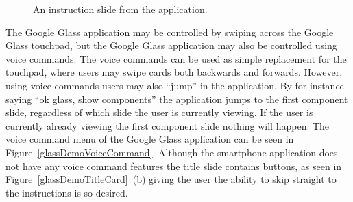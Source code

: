 	\begin{figure}[ht!]
		\centering
   		 \qquad
   		 \qquad
		\caption{An instruction slide from the application.}
		\label{glassDemoInstructionImage}
	\end{figure}
	
The Google Glass application may be controlled by swiping across the Google Glass touchpad, but the Google Glass application may also be controlled using voice commands. The voice commands can be used as simple replacement for the touchpad, where users may swipe cards both backwards and forwards. However, using voice commands users may also ``jump'' in the application. By for instance saying ``ok glass, show components'' the application jumps to the first component slide, regardless of which slide the user is currently viewing. If the user is currently already viewing the first component slide nothing will happen. The voice command menu of the Google Glass application can be seen in Figure~\ref{glassDemoVoiceCommand}. Although the smartphone application does not have any voice command features the title slide contains buttons, as seen in Figure~\ref{glassDemoTitleCard}~(b) giving the user the ability to skip straight to the instructions is so desired.
	
